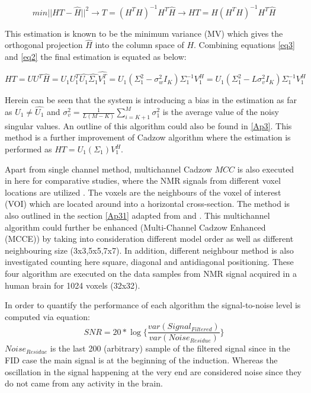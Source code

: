 \begin{equation}\label{eq2}
min||HT-\hat{H}||^{2}\rightarrow T=(H^{T}H)^{-1}H^{T}\hat{H}\rightarrow HT=H(H^{T}H)^{-1}H^{T}\hat{H}
\end{equation}

This estimation is known to be the minimum variance (MV) \cite{11} which gives the orthogonal projection $\hat{H}$ into the column space of $H$. Combining equations \ref{eq3} and \ref{eq2} the final estimation is equated as below:

\begin{equation}\label{eq5}
HT=UU^{T}\hat{H}=U_{1}U_{1}^{T}\hat{U_{1}}\hat{\Sigma_{1}}\hat{V_{1}^{T}}=U_{1}(\Sigma^{2}_{1}-\sigma^{2}_{w}I_{K})\Sigma_{1}^{-1}V_{1}^{H}=U_{1}(\Sigma^{2}_{1}-L\sigma^{2}_{v}I_{K})\Sigma_{1}^{-1}V_{1}^{H}
\end{equation}

Herein can be seen that the system is introducing a bias in the estimation as far as $U_{1}\neq\hat{U_{1}}$ and $\sigma^{2}_{v}=\frac{1}{L(M-K)}\sum_{i=K+1}^{M}\sigma_{1}^{2}$ is the average value of the noisy singular values. An outline of this algorithm could also be found in \ref{Ap3}. This method is a further improvement of Cadzow algorithm \cite{5} where the estimation is performed as $HT=U_{1}(\Sigma_{1})V_{1}^{H}$.

Apart from single channel method, multichannel Cadzow $MCC$ is also executed in here for comparative studies, where the NMR signals from different voxel locations are utilized \cite{14}. The voxels are the neighbours of the voxel of interest (VOI) which are located around into a horizontal cross-section. The method is also outlined in the section \ref{Ap31} adapted from \cite{13} and \cite{14}. This multichannel algorithm could further be enhanced (Multi-Channel Cadzow Enhanced (MCCE)) by taking into consideration different model order as well as different neighbouring size (3x3,5x5,7x7). In addition, different neighbour method is also investigated counting here square, diagonal and antidiagonal positioning. These four algorithm are executed on the data samples from NMR signal acquired in a human brain for 1024 voxels (32x32). 

In order to quantify the performance of each algorithm the signal-to-noise level is computed via equation:
\begin{equation}\label{SNR1}
SNR=20*\log\bigg\{\frac{var(Signal_{Filtered})}{var(Noise_{Residue})}\bigg\}
\end{equation} 
$Noise_{Residue}$ is the last 200 (arbitrary) sample of the filtered signal since in the FID case the main signal is at the beginning of the induction. Whereas the oscillation in the signal happening at the very end are considered noise since they do not came from any activity in the brain. 






